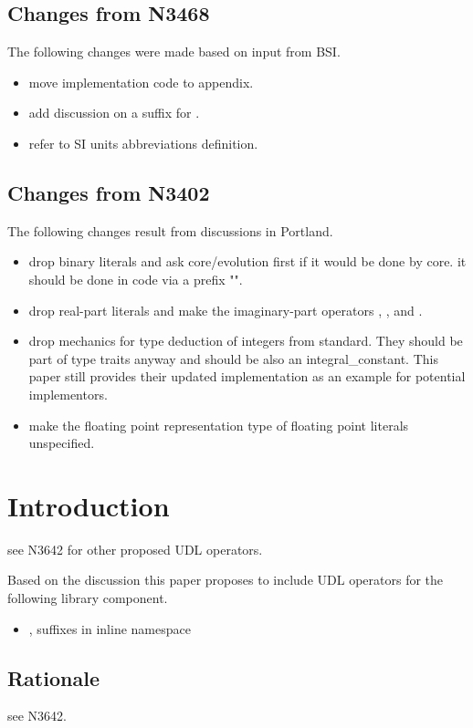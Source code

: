 \documentclass[ebook,11pt,article]{memoir}
\begin{document}
\section{Changes from N3468}
The following changes were made based on input from BSI.
\begin{itemize}
\item move implementation code to appendix.
\item add discussion on a suffix for .
\item refer to SI units abbreviations definition.
\end{itemize}

\section{Changes from N3402}
The following changes result from discussions in Portland.
\begin{itemize}
\item drop binary literals and ask core/evolution first if it would be done by core. it should be done in code via a prefix "".
\item drop real-part  literals  and make the imaginary-part operators , , and .
\item drop mechanics for type deduction of integers from standard. They should be part of type traits anyway and should be also an integral\_constant. This paper still provides their updated implementation as an example for potential implementors.
\item make the floating point representation type of  floating point literals unspecified.
\end{itemize}


\chapter{Introduction}
see N3642 for other proposed UDL operators.

Based on the discussion this paper proposes to include UDL operators for the following library component.
\begin{itemize}
\item {}, suffixes  in inline namespace 
\end{itemize}

\section{Rationale}
see N3642.
\end{document}
